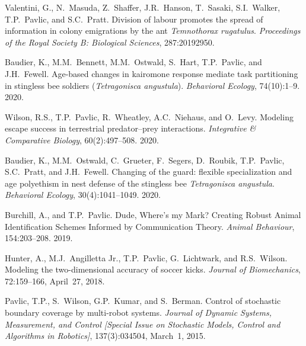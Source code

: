 \documentclass[10pt]{article}           %
\begin{document}
\begin{bibenum}
    \item Valentini, G., N.~Masuda, Z.~Shaffer, J.R.~Hanson, T.~Sasaki,
        S.I.~Walker, T.P.~Pavlic, and S.C.~Pratt.
        Division of labour promotes the spread of information in colony
        emigrations by the ant \emph{Temnothorax rugatulus}.
        \emph{Proceedings of the Royal Society B: Biological Sciences},
        287:20192950.

    \item Baudier, K., M.M.~Bennett, M.M.~Ostwald, S.~Hart, T.P.~Pavlic,
        and J.H.~Fewell. Age-based changes in kairomone response mediate
        task partitioning in stingless bee soldiers (\emph{Tetragonisca
        angustula}). \emph{Behavioral Ecology}, 74(10):1--9. 2020.

    \item Wilson, R.S., T.P.~Pavlic, R.~Wheatley, A.C.~Niehaus, and
        O.~Levy. Modeling escape success in terrestrial predator--prey
        interactions.
        \emph{Integrative \& Comparative Biology}, 60(2):497--508. 2020.

    \item Baudier, K., M.M.~Ostwald, C.~Grueter, F.~Segers, D.~Roubik,
        T.P.~Pavlic, S.C.~Pratt, and J.H.~Fewell. Changing of the guard:
        flexible specialization and age polyethism in nest defense of
        the stingless bee \emph{Tetragonisca angustula}.
        \emph{Behavioral Ecology}, 30(4):1041--1049. 2020.

    \item Burchill, A., and T.P.~Pavlic. Dude, Where's my Mark? Creating
        Robust Animal Identification Schemes Informed by Communication
        Theory. \emph{Animal Behaviour}, 154:203--208. 2019.

    \item Hunter, A., M.J.~Angilletta Jr., T.P.~Pavlic, G.~Lichtwark,
        and R.S.~Wilson. Modeling the two-dimensional accuracy of soccer
        kicks. \emph{Journal of Biomechanics}, 72:159--166, April~27,
        2018. 

    \item Pavlic, T.P., S.~Wilson, G.P.~Kumar, and S.~Berman. Control of
        stochastic boundary coverage by multi-robot systems.
        \emph{Journal of Dynamic Systems, Measurement, and Control
        [Special Issue on Stochastic Models, Control and Algorithms
        in Robotics]}, 137(3):034504, March~1, 2015.


\end{bibenum}
\end{document}

